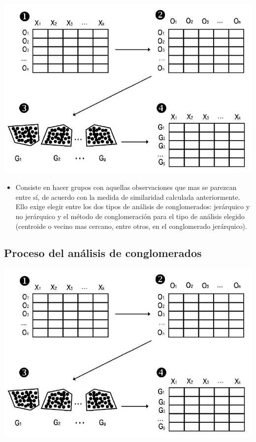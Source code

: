 \documentclass[]{article}
\providecommand{\tightlist}{%
  \setlength{\itemsep}{0pt}\setlength{\parskip}{0pt}}
\begin{document}
\hypertarget{left}{}
\includegraphics[width=1\linewidth]{images/proc_congl}

\hypertarget{right}{}
\begin{itemize}
\tightlist
\item
  Consiste en hacer grupos con aquellas observaciones que mas se
  parezcan entre sí, de acuerdo con la medida de similaridad calculada
  anteriormente. Ello exige elegir entre los dos tipos de análisis de
  conglomerados: jerárquico y no jerárquico y el método de
  conglomeración para el tipo de análisis elegido (centroide o vecino
  mas cercano, entre otros, en el conglomerado jerárquico).
\end{itemize}

\subsection{Proceso del análisis de
conglomerados}\label{proceso-del-anuxe1lisis-de-conglomerados-2}

\hypertarget{left}{}
\includegraphics[width=1\linewidth]{images/proc_congl}
\end{document}
